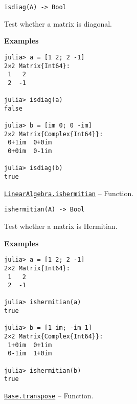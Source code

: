 \begin{adjustwidth}{2em}{0pt}


\begin{verbatim}
isdiag(A) -> Bool
\end{verbatim}

Test whether a matrix is diagonal.

\textbf{Examples}


\begin{verbatim}
julia> a = [1 2; 2 -1]
2×2 Matrix{Int64}:
 1   2
 2  -1

julia> isdiag(a)
false

julia> b = [im 0; 0 -im]
2×2 Matrix{Complex{Int64}}:
 0+1im  0+0im
 0+0im  0-1im

julia> isdiag(b)
true
\end{verbatim}



\end{adjustwidth}
\hypertarget{2319981190929881860}{}
\hyperlink{2319981190929881860}{\texttt{LinearAlgebra.ishermitian}}  -- {Function.}

\begin{adjustwidth}{2em}{0pt}


\begin{verbatim}
ishermitian(A) -> Bool
\end{verbatim}

Test whether a matrix is Hermitian.

\textbf{Examples}


\begin{verbatim}
julia> a = [1 2; 2 -1]
2×2 Matrix{Int64}:
 1   2
 2  -1

julia> ishermitian(a)
true

julia> b = [1 im; -im 1]
2×2 Matrix{Complex{Int64}}:
 1+0im  0+1im
 0-1im  1+0im

julia> ishermitian(b)
true
\end{verbatim}



\end{adjustwidth}
\hypertarget{12700837529519091997}{}
\hyperlink{12700837529519091997}{\texttt{Base.transpose}}  -- {Function.}

